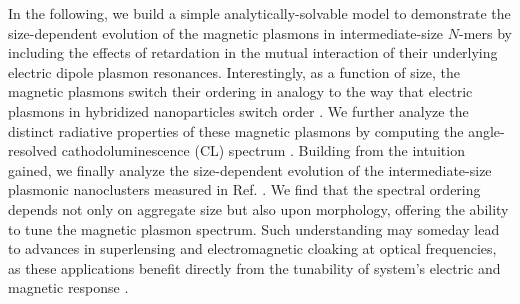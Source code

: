 \documentclass[journal=apchd5,manuscript=article]{achemso}
\begin{document}
In the following, we build a simple analytically-solvable model to demonstrate the size-dependent evolution of the magnetic plasmons in intermediate-size $N$-mers by including the effects of retardation in the mutual interaction of their underlying electric dipole plasmon resonances. Interestingly, as a function of size, the magnetic plasmons switch their ordering in analogy to the way that electric plasmons in hybridized nanoparticles switch order \cite{vonPlessen2007}. We further analyze the distinct radiative properties of these magnetic plasmons by computing the angle-resolved cathodoluminescence (CL) spectrum \cite{Hohenester2014,Coenen2011,CoPol2011,Polman2014}. Building from the intuition gained, we finally analyze the size-dependent evolution of the intermediate-size plasmonic nanoclusters measured in Ref. \cite{Engheta2017}. We find that the spectral ordering depends not only on aggregate size but also upon morphology, offering the ability to tune the magnetic plasmon spectrum. Such understanding may someday lead to advances in superlensing and electromagnetic cloaking at optical frequencies, as these applications benefit directly from the tunability of system's electric and magnetic response \cite{Pendry03,Fang2005,Cai2007,Pinchuk07,Shalaev2008,Valentine2008,Ferrari09,Tian2018}.
\end{document}

